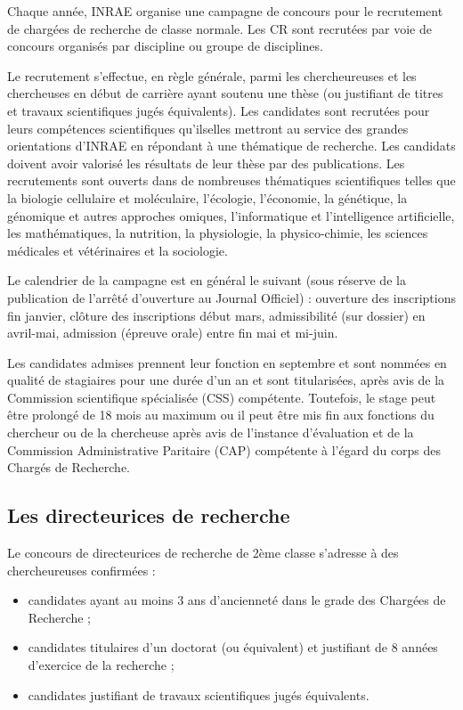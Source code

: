 Chaque ann\'ee, INRAE organise une campagne de concours pour le recrutement de  charg\'e\mp e\mp s de recherche de classe normale. Les CR sont recrut\'e\mp e\mp s par voie de concours organis\'es par discipline ou groupe de disciplines. 

Le recrutement s’effectue, en r\`egle g\'en\'erale, parmi les chercheur\mp euse\mp s et les chercheuses en d\'ebut de carri\`ere ayant soutenu une th\`ese (ou justifiant de titres et travaux scientifiques jug\'es \'equivalents). Les candidat\mp e\mp s sont recrut\'e\mp e\mp s pour leurs comp\'etences scientifiques qu'ils\mp elles mettront au service des grandes orientations d'INRAE en r\'epondant \`a une th\'ematique de recherche. Les candidats doivent avoir valoris\'e les r\'esultats de leur th\`ese par des publications. Les recrutements sont ouverts dans de nombreuses th\'ematiques scientifiques telles que la biologie cellulaire et mol\'eculaire, l'\'ecologie, l'\'economie, la g\'en\'etique, la g\'enomique et autres approches \og omiques\fg{}, l'informatique et l'intelligence artificielle, les math\'ematiques, la nutrition, la physiologie, la physico-chimie, les sciences m\'edicales et v\'et\'erinaires et la sociologie. 

Le calendrier de la campagne est en g\'en\'eral le suivant (sous r\'eserve de la publication de l'arr\^et\'e d'ouverture au Journal Officiel) : ouverture des inscriptions fin janvier, cl\^oture des inscriptions d\'ebut mars, admissibilit\'e (sur dossier) en avril-mai, admission (\'epreuve orale) entre fin mai et mi-juin. 

Les candidat\mp e\mp s admis\mp e\mp s prennent leur fonction en septembre et sont nomm\'e\mp e\mp s en qualit\'e de stagiaires pour une dur\'ee d'un an et sont titularis\'e\mp es, apr\`es avis de la Commission scientifique sp\'ecialis\'ee (CSS) comp\'etente. Toutefois, le stage peut \^etre prolong\'e de 18 mois au maximum ou il peut \^etre mis fin aux fonctions du chercheur ou de la chercheuse apr\`es avis de l'instance d'\'evaluation et de la Commission Administrative Paritaire (CAP) comp\'etente \`a l'\'egard du corps des Charg\'es de Recherche.


\subsection{ Les directeur\mp ice\mp s de recherche}

Le concours de directeur\mp ice\mp s de recherche de 2\`eme classe s'adresse \`a des chercheur\mp euse\mp s confirm\'e\mp e\mp s :
\begin{itemize}
\item candidat\mp e\mp s ayant au moins 3 ans d'anciennet\'e dans le grade des Charg\'e\mp e\mp s de Recherche ;
\item candidat\mp e\mp s titulaires d'un doctorat (ou \'equivalent) et justifiant de 8 ann\'ees d'exercice de la recherche ;
\item candidat\mp e\mp s justifiant de travaux scientifiques jug\'es \'equivalents.
\end{itemize}


